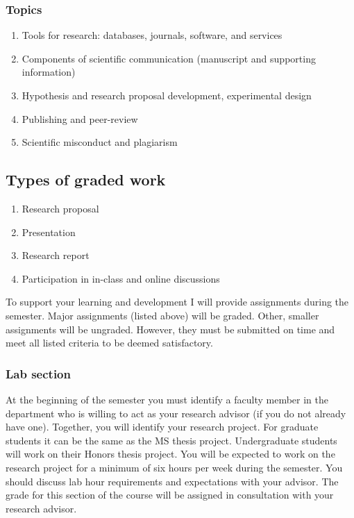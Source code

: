 \hypertarget{topics}{%
\subsubsection{Topics}\label{topics}}

\begin{enumerate}
\def\labelenumi{\arabic{enumi}.}
\tightlist
\item
  Tools for research: databases, journals, software, and services
\item
  Components of scientific communication (manuscript and supporting
  information)
\item
  Hypothesis and research proposal development, experimental design
\item
  Publishing and peer-review
\item
  Scientific misconduct and plagiarism
\end{enumerate}

\hypertarget{types-of-graded-work}{%
\subsection{Types of graded work}\label{types-of-graded-work}}

\begin{enumerate}
\def\labelenumi{\arabic{enumi}.}
\tightlist
\item
  Research proposal
\item
  Presentation
\item
  Research report
\item
  Participation in in-class and online discussions
\end{enumerate}

To support your learning and development I will provide assignments
during the semester. Major assignments (listed above) will be graded.
Other, smaller assignments will be ungraded. However, they must be
submitted on time and meet all listed criteria to be deemed
satisfactory.

\hypertarget{lab-section}{%
\subsubsection{Lab section}\label{lab-section}}

At the beginning of the semester you must identify a faculty member in
the department who is willing to act as your research advisor (if you do
not already have one). Together, you will identify your research
project. For graduate students it can be the same as the MS thesis
project. Undergraduate students will work on their Honors thesis
project. You will be expected to work on the research project for a
minimum of six hours per week during the semester. You should discuss
lab hour requirements and expectations with your advisor. The grade for
this section of the course will be assigned in consultation with your
research advisor.

